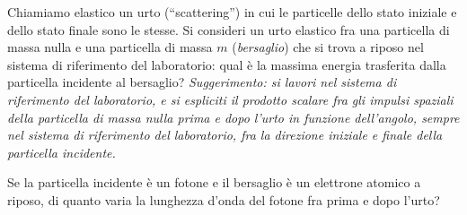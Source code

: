 \begin{Exercise}[title={Diffusione elastica di un fotone su un bersaglio}]
Chiamiamo elastico un urto (``scattering'') in cui le particelle dello
stato iniziale e dello stato finale sono le stesse. Si consideri un
urto elastico fra una particella di massa nulla e una particella di
massa $m$ (\emph{bersaglio}) che si trova a riposo nel sistema di
riferimento del laboratorio: qual è la massima energia trasferita
dalla particella incidente al bersaglio? \emph{Suggerimento: si lavori
nel sistema di riferimento del laboratorio, e si espliciti il prodotto
scalare fra gli impulsi spaziali della particella di massa nulla prima
e dopo l'urto in funzione dell'angolo, sempre nel sistema di
riferimento del laboratorio, fra la direzione iniziale e finale della
particella incidente.}

Se la particella incidente è un fotone e il bersaglio è un elettrone atomico a riposo, di quanto varia la lunghezza d'onda del fotone fra prima e dopo l'urto?
\end{Exercise}

